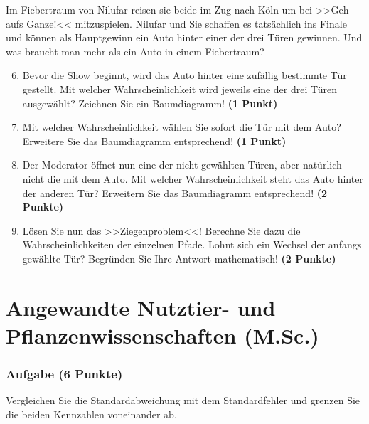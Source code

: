 \documentclass[a4paper, 9pt]{scrartcl}\usepackage[]{graphicx}\usepackage[]{xcolor}
\begin{document}
Im Fiebertraum von Nilufar reisen sie beide im Zug nach Köln um bei >>Geh aufs Ganze!<< mitzuspielen. Nilufar und Sie schaffen es tatsächlich ins Finale und können als Hauptgewinn ein Auto hinter einer der drei Türen gewinnen. Und was braucht man mehr als ein Auto in einem Fiebertraum? 

\begin{enumerate}
  \setcounter{enumi}{5}  
\item Bevor die Show beginnt, wird das Auto hinter eine zufällig bestimmte Tür gestellt. Mit welcher Wahrscheinlichkeit wird jeweils eine der drei Türen ausgewählt? Zeichnen Sie ein Baumdiagramm! \textbf{(1 Punkt)}
\item Mit welcher Wahrscheinlichkeit wählen Sie sofort die Tür mit dem Auto? Erweitere Sie das Baumdiagramm entsprechend! \textbf{(1 Punkt)}
\item Der Moderator öffnet nun eine der nicht gewählten Türen, aber natürlich nicht die mit dem Auto. Mit welcher Wahrscheinlichkeit steht das Auto hinter der anderen Tür? Erweitern Sie das Baumdiagramm entsprechend! \textbf{(2 Punkte)}
\item Lösen Sie nun das >>Ziegenproblem<<! Berechne Sie dazu die Wahrscheinlichkeiten der einzelnen Pfade. Lohnt sich ein Wechsel der anfangs gewählte Tür? Begründen Sie Ihre Antwort mathematisch! \textbf{(2 Punkte)}
\end{enumerate}
 






 
\clearpage
\part{Angewandte Nutztier- und Pflanzenwissenschaften (M.Sc.)}

\section{Aufgabe \hfill (6 Punkte)}
Vergleichen Sie die Standardabweichung mit dem Standardfehler und grenzen
Sie die beiden Kennzahlen voneinander ab.
\end{document}
